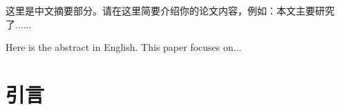 \documentclass{jluthesis}
\begin{document}
    \makecover
	\makecommitment
	

    \begin{cabstract}
        这里是中文摘要部分。请在这里简要介绍你的论文内容，例如：本文主要研究了......
        
    \end{cabstract}
	
    \begin{eabstract}
        Here is the abstract in English. This paper focuses on...
        
    \end{eabstract}
	
    \makeTOC
	
    \startmainmatter
	
	\section{引言}
	
\end{document}
